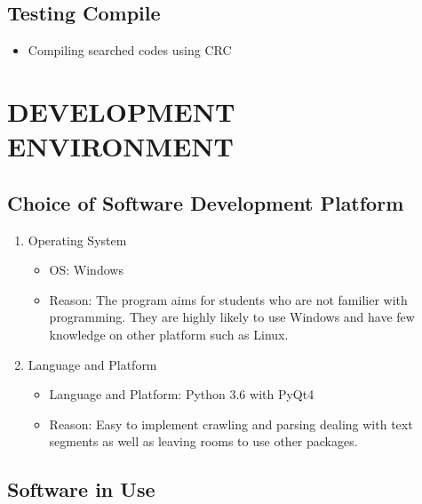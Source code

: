 \documentclass[conference]{IEEEtran}
\begin{document}
\subsection{Testing Compile}
  \begin{itemize}
    \item Compiling searched codes using CRC
  \end{itemize}
\textit{ }

\section{DEVELOPMENT ENVIRONMENT} %
\label{sec:development_environment}
\subsection{Choice of Software Development Platform} %
\label{sub:choice_of_software_development_platform}

\begin{enumerate}
  \item Operating System
  \begin{itemize}
    \item OS: Windows
    \item Reason: The program aims for students who are not familier with programming. They are highly likely to use Windows and have few knowledge on other platform such as Linux.
  \end{itemize}
  \item Language and Platform
  \begin{itemize}
    \item Language and Platform: Python 3.6 with PyQt4
    \item Reason: Easy to implement crawling and parsing dealing with text segments as well as leaving rooms to use other packages.
  \end{itemize}
\end{enumerate}
\textit{}


\subsection{Software in Use} %
\label{sub:software_in_use}
\end{document}
